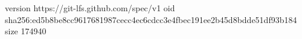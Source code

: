 version https://git-lfs.github.com/spec/v1
oid sha256:ed5b8be8cc9617681987cecc4ec6cdcc3e4fbec191ee2b45d8bdde51df93b184
size 174940
